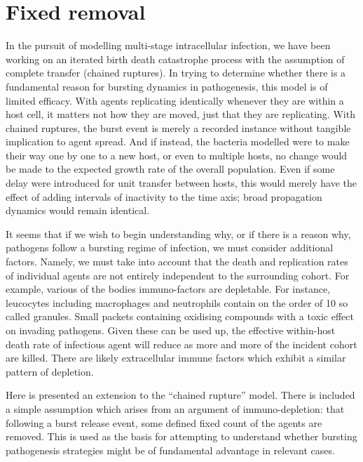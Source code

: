 \section{Fixed removal}



In the pursuit of modelling multi-stage intracellular infection, we have been working on an iterated birth death catastrophe process with the assumption of complete transfer (chained ruptures). In trying to determine whether there is a fundamental reason for bursting dynamics in pathogenesis, this model is of limited efficacy. With agents replicating identically whenever they are within a host cell, it matters not how they are moved, just that they are replicating. With chained ruptures, the burst event is merely a recorded instance without tangible implication to agent spread. And if instead, the bacteria modelled were to make their way one by one to a new host, or even to multiple hosts, no change would be made to the expected growth rate of the overall population. Even if some delay were introduced for unit transfer between hosts, this would merely have the effect of adding intervals of inactivity to the time axis; broad propagation dynamics would remain identical.\par

It seems that if we wish to begin understanding why, or if there is a reason why, pathogens follow a bursting regime of infection, we must consider additional factors. Namely, we must take into account that the death and replication rates of individual agents are not entirely independent to the surrounding cohort. For example, various of the bodies immuno-factors are depletable. For instance, leucocytes including macrophages and neutrophils contain on the order of 10 so called granules. Small packets containing oxidising compounds with a toxic effect on invading pathogens. Given these can be used up, the effective within-host death rate of infectious agent will reduce as more and more of the incident cohort are killed. There are likely extracellular immune factors which exhibit a similar pattern of depletion.\par

Here is presented an extension to the ``chained rupture'' model. There is included a simple assumption which arises from an argument of immuno-depletion: that following a burst release event, some defined fixed count of the agents are removed. This is used as the basis for attempting to understand whether bursting pathogenesis strategies might be of fundamental advantage in relevant cases.


